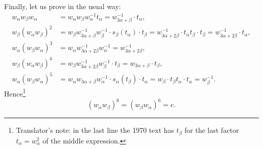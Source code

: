 Finally, let us prove  in the usual way:
\[
\begin{aligned}
 w_\alpha w_\beta w_\alpha
  &=w_\alpha w_\beta w_\alpha^{-1}t_\alpha
   =w_{3\alpha+\beta}^{-1}\cdot t_\alpha,\\
 w_\beta(w_\alpha w_\beta)^2
  &=w_\beta w_{3\alpha+\beta}^{-1}w_\beta^{-1}\cdot s_\beta(t_\alpha)\cdot t_\beta
   =w_{3\alpha+2\beta}^{-1}\cdot t_\alpha t_\beta\cdot t_\beta
   =w_{3\alpha+2\beta}^{-1}\cdot t_\alpha,\\
 w_\alpha(w_\beta w_\alpha)^3
  &=w_\alpha w_{3\alpha+2\beta}^{-1}w_\alpha^{-1}
   =w_{3\alpha+2\beta}^{-1},\\
 w_\beta(w_\alpha w_\beta)^4
  &=w_\beta w_{3\alpha+2\beta}^{-1}w_\beta^{-1}\cdot t_\beta
   =w_{3\alpha+\beta}\cdot t_\beta,\\
 w_\alpha(w_\beta w_\alpha)^5
  &=w_\alpha w_{3\alpha+\beta}w_\alpha^{-1}\cdot s_\alpha(t_\beta)\cdot t_\alpha
   =w_\beta\cdot t_\beta t_\alpha\cdot t_\alpha
   =w_\beta^{-1}.
\end{aligned}
\]
Hence\footnote{Translator's note: in the last line the 1970 text has \(t_\beta\) for the
last factor \(t_\alpha=w_\alpha^2\) of the middle expression.}
\[
  (w_\alpha w_\beta)^6=(w_\beta w_\alpha)^6=e.
\]

